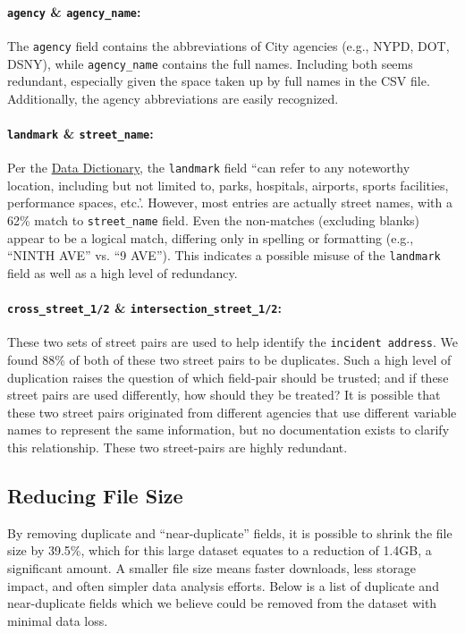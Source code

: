 \documentclass[linenumber]{jdsart}
\begin{document}
\paragraph{\texttt{agency} \& \texttt{agency\_name}:} The \texttt{agency} 
field contains the abbreviations of City agencies (e.g., NYPD, DOT, DSNY), 
while \texttt{agency\_name} contains the full names. Including both seems 
redundant, especially given the space taken up by full names in the 
CSV file. Additionally, the agency abbreviations are easily recognized.

\paragraph{\texttt{landmark} \& \texttt{street\_name}:} Per the \href{https://data.cityofnewyork.us/api/views/erm2-nwe9/files/b372b884-f86a-453b-ba16-1fe06ce9d212?download=true&filename=311_ServiceRequest_2010-Present_DataDictionary_Updated_2023.xlsx}{Data Dictionary}, 
the \texttt{landmark} field ``can refer to any noteworthy location, 
including but not limited to, parks, hospitals, airports, sports facilities, 
performance spaces, etc.'. However, most entries are actually 
street names, with a 62\% match to \texttt{street\_name} field. 
Even the non\mbox{-}matches (excluding blanks) appear to be 
a logical match, differing only in spelling or formatting 
(e.g., ``NINTH AVE'' vs. ``9 AVE''). This indicates a possible 
misuse of the \texttt{landmark} field as well as a high level of redundancy.

\paragraph{\texttt{cross\_street\_1/2} \& \texttt{intersection\_street\_1/2}:} These 
two sets of street pairs are used to help identify the 
\texttt{incident address}. We found 88\% of both of these two 
street pairs to be duplicates. Such a high level of duplication 
raises the question of which field\mbox{-}pair should be trusted; 
and if these street pairs are used differently, how should they be treated?
It is possible that these two street pairs originated from different 
agencies that use different variable names to represent the same 
information, but no documentation exists to clarify this 
relationship. These two street\mbox{-}pairs are highly redundant.


\subsection{Reducing File Size}
\label{sec:filesize}
By removing duplicate and ``near\mbox{-}duplicate'' fields, it is possible to 
shrink the file size by 39.5\%, which for this large dataset equates to 
a reduction of 1.4GB, a significant amount. A smaller file size 
means faster downloads, less storage impact, and often 
simpler data analysis efforts. Below is a list of duplicate 
and near\mbox{-}duplicate fields which we believe could be
removed from the dataset with minimal data loss. 
\end{document}
